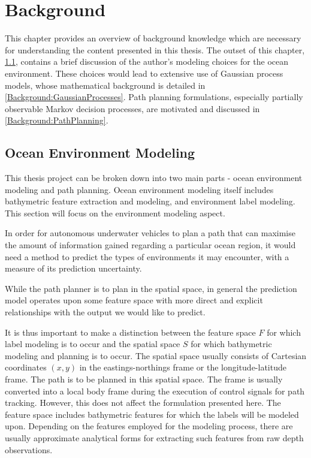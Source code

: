 \chapter{Background}
\label{Background}
	
	This chapter provides an overview of background knowledge which are necessary for understanding the content presented in this thesis. The outset of this chapter, \cref{Background:OceanEnvironmentModeling}, contains a brief discussion of the author's modeling choices for the ocean environment. These choices would lead to extensive use of Gaussian process models, whose mathematical background is detailed in \cref{Background:GaussianProcesses}. Path planning formulations, especially partially observable Markov decision processes, are motivated and discussed in \cref{Background:PathPlanning}.
	
	\section{Ocean Environment Modeling}
	\label{Background:OceanEnvironmentModeling}
	
		This thesis project can be broken down into two main parts - ocean environment modeling and path planning. Ocean environment modeling itself includes bathymetric feature extraction and modeling, and environment label modeling. This section will focus on the environment modeling aspect.
			
		In order for autonomous underwater vehicles to plan a path that can maximise the amount of information gained regarding a particular ocean region, it would need a method to predict the types of environments it may encounter, with a measure of its prediction uncertainty.
		
		While the path planner is to plan in the spatial space, in general the prediction model operates upon some feature space with more direct and explicit relationships with the output we would like to predict.
		
		It is thus important to make a distinction between the feature space $F$ for which label modeling is to occur and the spatial space $S$ for which bathymetric modeling and planning is to occur. The spatial space usually consists of Cartesian coordinates $(x, y)$ in the eastings-northings frame or the longitude-latitude frame. The path is to be planned in this spatial space. The frame is usually converted into a local body frame during the execution of control signals for path tracking. However, this does not affect the formulation presented here. The feature space includes bathymetric features for which the labels will be modeled upon. Depending on the features employed for the modeling process, there are usually approximate analytical forms for extracting such features from raw depth observations.

